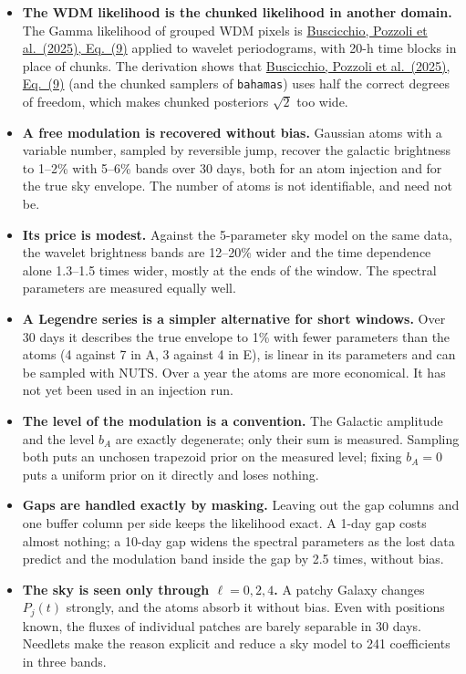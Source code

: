 \documentclass[11pt,a4paper]{article}
\newcommand{\urlPone}{https://arxiv.org/pdf/2511.03604}
\newcommand{\PoneEq}[1]{\href{\urlPone}{Buscicchio, Pozzoli et al.~(2025), Eq.~(#1)}}
\begin{document}
\begin{itemize}
  \item \textbf{The WDM likelihood is the chunked likelihood in another domain.} The
        Gamma likelihood of grouped WDM pixels is \PoneEq{9} applied to wavelet
        periodograms, with 20-h time blocks in place of chunks. The derivation shows
        that \PoneEq{9} (and the chunked samplers of \texttt{bahamas}) uses half the
        correct degrees of freedom, which makes chunked posteriors $\sqrt2$ too wide.
  \item \textbf{A free modulation is recovered without bias.} Gaussian atoms with a
        variable number, sampled by reversible jump, recover the galactic brightness to
        1--2\% with 5--6\% bands over 30 days, both for an atom injection and for the
        true sky envelope. The number of atoms is not identifiable, and need not be.
  \item \textbf{Its price is modest.} Against the 5-parameter sky model on the same
        data, the wavelet brightness bands are 12--20\% wider and the time dependence
        alone 1.3--1.5 times wider, mostly at the ends of the window. The spectral
        parameters are measured equally well.
  \item \textbf{A Legendre series is a simpler alternative for short windows.} Over
        30 days it describes the true envelope to 1\% with fewer parameters than the
        atoms (4 against 7 in A, 3 against 4 in E), is linear in its parameters and
        can be sampled with NUTS. Over a year the atoms are more economical. It has not
        yet been used in an injection run.
  \item \textbf{The level of the modulation is a convention.} The Galactic amplitude
        and the level $b_A$ are exactly degenerate; only their sum is measured.
        Sampling both puts an unchosen trapezoid prior on the measured level; fixing
        $b_A=0$ puts a uniform prior on it directly and loses nothing.
  \item \textbf{Gaps are handled exactly by masking.} Leaving out the gap columns and
        one buffer column per side keeps the likelihood exact. A 1-day gap costs almost
        nothing; a 10-day gap widens the spectral parameters as the lost data predict
        and the modulation band inside the gap by 2.5 times, without bias.
  \item \textbf{The sky is seen only through $\ell=0,2,4$.} A patchy Galaxy changes
        $P_j(t)$ strongly, and the atoms absorb it without bias. Even with positions
        known, the fluxes of individual patches are barely separable in 30 days.
        Needlets make the reason explicit and reduce a sky model to 241 coefficients in
        three bands.
\end{itemize}
\end{document}
